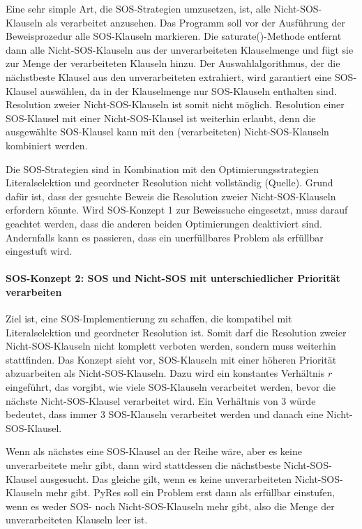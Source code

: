 Eine sehr simple Art, die SOS-Strategien umzusetzen, ist, alle Nicht-SOS-Klauseln als verarbeitet anzusehen. Das Programm soll vor der Ausführung der Beweisprozedur alle SOS-Klauseln markieren. Die saturate()-Methode entfernt dann alle Nicht-SOS-Klauseln aus der unverarbeiteten Klauselmenge und fügt sie zur Menge der verarbeiteten Klauseln hinzu. Der Auswahlalgorithmus, der die nächstbeste Klausel aus den unverarbeiteten extrahiert, wird garantiert eine SOS-Klausel auswählen, da in der Klauselmenge nur SOS-Klauseln enthalten sind. Resolution zweier Nicht-SOS-Klauseln ist somit nicht möglich. Resolution einer SOS-Klausel mit einer Nicht-SOS-Klausel ist weiterhin erlaubt, denn die ausgewählte SOS-Klausel kann mit den (verarbeiteten) Nicht-SOS-Klauseln kombiniert werden. 

Die SOS-Strategien sind in Kombination mit den Optimierungsstrategien Literalselektion und geordneter Resolution nicht vollständig (Quelle). Grund dafür ist, dass der gesuchte Beweis die Resolution zweier Nicht-SOS-Klauseln erfordern könnte. Wird SOS-Konzept 1 zur Beweissuche eingesetzt, muss darauf geachtet werden, dass die anderen beiden Optimierungen deaktiviert sind. Andernfalls kann es passieren, dass ein unerfüllbares Problem als erfüllbar eingestuft wird. 

\paragraph{SOS-Konzept 2: SOS und Nicht-SOS mit unterschiedlicher Priorität verarbeiten}

Ziel ist, eine SOS-Implementierung zu schaffen, die kompatibel mit Literalselektion und geordneter Resolution ist. Somit darf die Resolution zweier Nicht-SOS-Klauseln nicht komplett verboten werden, sondern muss weiterhin stattfinden. Das Konzept sieht vor, SOS-Klauseln mit einer höheren Priorität abzuarbeiten als Nicht-SOS-Klauseln. Dazu wird ein konstantes Verhältnis $r$ eingeführt, das vorgibt, wie viele SOS-Klauseln verarbeitet werden, bevor die nächste Nicht-SOS-Klausel verarbeitet wird. Ein Verhältnis von 3 würde bedeutet, dass immer 3 SOS-Klauseln verarbeitet werden und danach eine Nicht-SOS-Klausel.

Wenn als nächstes eine SOS-Klausel an der Reihe wäre, aber es keine unverarbeitete mehr gibt, dann wird stattdessen die nächstbeste Nicht-SOS-Klausel ausgesucht. Das gleiche gilt, wenn es keine unverarbeiteten Nicht-SOS-Klauseln mehr gibt. PyRes soll ein Problem erst dann als erfüllbar einstufen, wenn es weder SOS- noch Nicht-SOS-Klauseln mehr gibt, also die Menge der unverarbeiteten Klauseln leer ist.


